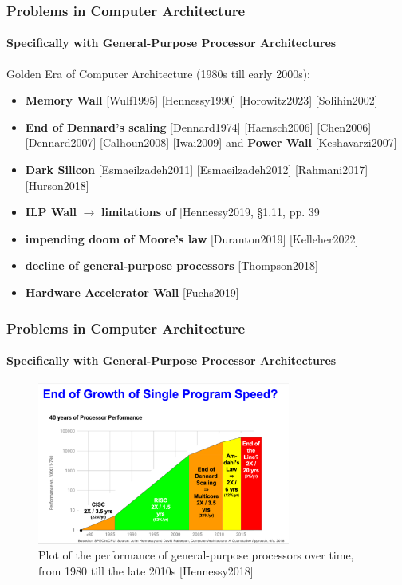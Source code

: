 \documentclass[xcolor={usenames,dvipsnames},hyperref={hyperindex,bookmarks}]{beamer}
\begin{document}
\begin{frame}
	\frametitle{Problems in Computer Architecture}
	\framesubtitle{Specifically with General-Purpose Processor Architectures}
	
	Golden Era of Computer Architecture (1980s till early 2000s): \begin{itemize} %
	\item {\bf Memory Wall} [Wulf1995] [Hennessy1990] [Horowitz2023] [Solihin2002]
	\item {\bf End of Dennard's scaling} [Dennard1974] [Haensch2006] [Chen2006] [Dennard2007] [Calhoun2008] [Iwai2009] and {\bf Power Wall} [Keshavarzi2007]
	\item {\bf Dark Silicon} [Esmaeilzadeh2011] [Esmaeilzadeh2012] [Rahmani2017] [Hurson2018]
	\item {\bf ILP Wall} $\rightarrow$ {\bf limitations of } [Hennessy2019, \S1.11, pp. 39]
	\item {\bf impending doom of Moore's law} [Duranton2019] [Kelleher2022]
	\item {\bf decline of general-purpose processors} [Thompson2018]
	\item {\bf Hardware Accelerator Wall} [Fuchs2019]
	\end{itemize}

\end{frame}





\begin{frame}
	\frametitle{Problems in Computer Architecture}
	\framesubtitle{Specifically with General-Purpose Processor Architectures}
	
	\begin{figure}
		\centering
		\includegraphics[height=2.1in]{./pics/ProblemsInComputerArchitecture}
		\caption{Plot of the performance of general-purpose processors over time, from 1980 till the late 2010s [Hennessy2018]}
	\end{figure}
\end{frame}
\end{document}
